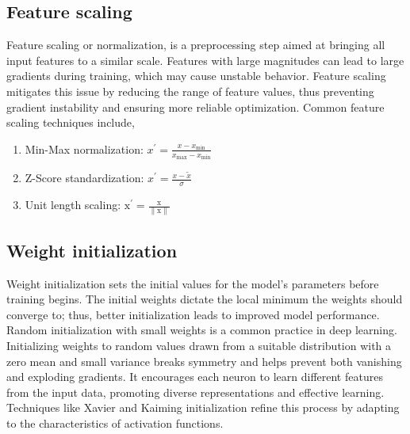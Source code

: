 \subsection{Feature scaling}Feature scaling or normalization, is a preprocessing step aimed at bringing all input features to a similar scale. Features with large magnitudes can lead to large gradients during training, which may cause unstable behavior. Feature scaling mitigates this issue by reducing the range of feature values, thus preventing gradient instability and ensuring more reliable optimization. Common feature scaling techniques include,
\begin{enumerate}
\item Min-Max normalization: $x^{\prime}=\frac{x-x_{\min }}{x_{\max }-x_{\min }}$
\item Z-Score standardization: $x^{\prime}=\frac{x-\tilde{x}}{\sigma}$
\item Unit length scaling: $\mathrm{x}^{\prime}=\frac{\mathrm{x}}{\|\mathrm{x}\|}$
\end{enumerate}
\subsection{Weight initialization}
Weight initialization sets the initial values for the model's parameters before training begins. The initial weights dictate the local minimum the weights should converge to; thus, better initialization leads to improved model performance. %
Random initialization with small weights is a common practice in deep learning. Initializing weights to random values drawn from a suitable distribution with a zero mean and small variance breaks symmetry and helps prevent both vanishing and exploding gradients. It encourages each neuron to learn different features from the input data, promoting diverse representations and effective learning. Techniques like Xavier \cite{glorot} and Kaiming \cite{he2015} initialization refine this process by adapting to the characteristics of activation functions.
